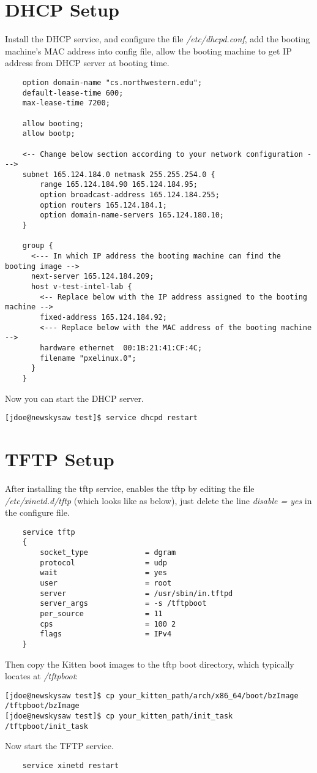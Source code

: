 \documentclass[11pt]{article}
\begin{document}
\section{DHCP Setup}
Install the DHCP service, and configure the file {\em /etc/dhcpd.conf}, add the booting machine's MAC address into config file, allow the booting machine to get IP address from DHCP server at booting time.
\begin{verbatim}
    option domain-name "cs.northwestern.edu";
    default-lease-time 600;
    max-lease-time 7200;

    allow booting;
    allow bootp;

    <-- Change below section according to your network configuration --->
    subnet 165.124.184.0 netmask 255.255.254.0 {
        range 165.124.184.90 165.124.184.95;
        option broadcast-address 165.124.184.255;
        option routers 165.124.184.1;
        option domain-name-servers 165.124.180.10;
    }

    group {
      <--- In which IP address the booting machine can find the booting image -->
      next-server 165.124.184.209;
      host v-test-intel-lab {
        <-- Replace below with the IP address assigned to the booting machine -->
        fixed-address 165.124.184.92;
        <--- Replace below with the MAC address of the booting machine -->
        hardware ethernet  00:1B:21:41:CF:4C;   
        filename "pxelinux.0";
      }
    } 
\end{verbatim}
Now you can start the DHCP server.
\begin{verbatim}
[jdoe@newskysaw test]$ service dhcpd restart
\end{verbatim}


\section{TFTP Setup}
After installing the tftp service, enables the tftp by editing the file {\em /etc/xinetd.d/tftp} (which looks like as below), just delete the line {\em disable = yes} in the configure file.
\begin{verbatim}
    service tftp
    {
        socket_type             = dgram
        protocol                = udp
        wait                    = yes
        user                    = root
        server                  = /usr/sbin/in.tftpd
        server_args             = -s /tftpboot
        per_source              = 11
        cps                     = 100 2
        flags                   = IPv4
    }

\end{verbatim}
Then copy the Kitten boot images to the tftp boot directory, which typically locates at {\em /tftpboot}:
\begin{verbatim}
[jdoe@newskysaw test]$ cp your_kitten_path/arch/x86_64/boot/bzImage /tftpboot/bzImage
[jdoe@newskysaw test]$ cp your_kitten_path/init_task /tftpboot/init_task
\end{verbatim}
Now start the TFTP service.
\begin{verbatim}
    service xinetd restart
\end{verbatim}
\end{document}
